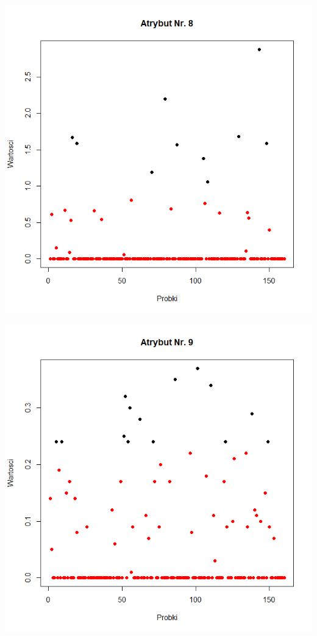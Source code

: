 \documentclass[a4paper,12pt,twoside]{article}
\begin{document}
\begin{center}
\includegraphics[width=.90\textwidth]{img/2_pkt_oddalone_8.png}
\end{center}

\begin{center}
\includegraphics[width=.90\textwidth]{img/2_pkt_oddalone_9.png}
\end{center}
\end{document}
